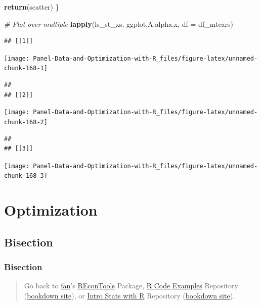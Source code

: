 \documentclass[
]{book}
\newenvironment{Shaded}{\begin{snugshade}}{\end{snugshade}}
\newcommand{\CommentTok}[1]{\textcolor[rgb]{0.56,0.35,0.01}{\textit{#1}}}
\newcommand{\DataTypeTok}[1]{\textcolor[rgb]{0.13,0.29,0.53}{#1}}
\newcommand{\KeywordTok}[1]{\textcolor[rgb]{0.13,0.29,0.53}{\textbf{#1}}}
\newcommand{\NormalTok}[1]{#1}
\begin{document}
\begin{Shaded}
\begin{Highlighting}[]
\KeywordTok{return}\NormalTok{(scatter)}
\NormalTok{\}}

\CommentTok{\# Plot over multiple}
\KeywordTok{lapply}\NormalTok{(ls\_st\_xs,}
\NormalTok{       ggplot.A.alpha.x,}
       \DataTypeTok{df =}\NormalTok{ df\_mtcars)}
\end{Highlighting}
\end{Shaded}

\begin{verbatim}
## [[1]]
\end{verbatim}

\begin{center}\texttt{[image: Panel-Data-and-Optimization-with-R\_files/figure-latex/unnamed-chunk-168-1]} \end{center}

\begin{verbatim}
## 
## [[2]]
\end{verbatim}

\begin{center}\texttt{[image: Panel-Data-and-Optimization-with-R\_files/figure-latex/unnamed-chunk-168-2]} \end{center}

\begin{verbatim}
## 
## [[3]]
\end{verbatim}

\begin{center}\texttt{[image: Panel-Data-and-Optimization-with-R\_files/figure-latex/unnamed-chunk-168-3]} \end{center}

\hypertarget{optimization}{%
\chapter{Optimization}\label{optimization}}

\hypertarget{bisection}{%
\section{Bisection}\label{bisection}}

\hypertarget{bisection-1}{%
\subsection{Bisection}\label{bisection-1}}

\begin{quote}
Go back to \href{http://fanwangecon.github.io/}{fan}'s \href{https://fanwangecon.github.io/REconTools/}{REconTools} Package, \href{https://fanwangecon.github.io/R4Econ/}{R Code Examples} Repository (\href{https://fanwangecon.github.io/R4Econ/bookdown}{bookdown site}), or \href{https://fanwangecon.github.io/Stat4Econ/}{Intro Stats with R} Repository (\href{https://fanwangecon.github.io/Stat4Econ/bookdown}{bookdown site}).
\end{quote}
\end{document}

